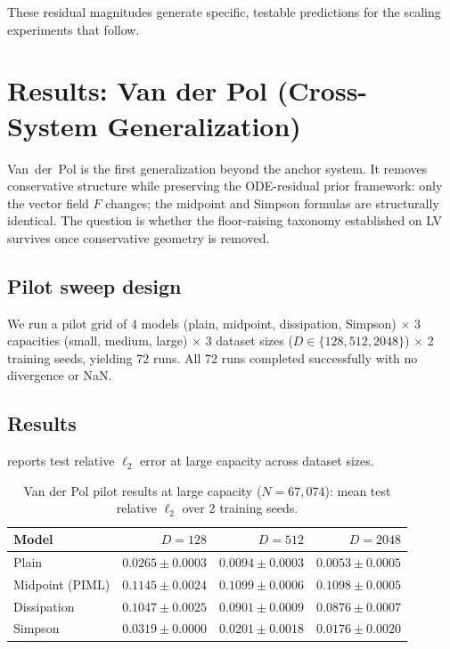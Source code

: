 \documentclass[11pt]{article}
\begin{document}
These residual magnitudes generate specific, testable predictions for the scaling experiments that follow.

\section{Results: Van der Pol (Cross-System Generalization)}
\label{sec:results-vdp}

Van~der~Pol is the first generalization beyond the anchor system.
It removes conservative structure while preserving the ODE-residual prior framework: only the vector field $F$ changes; the midpoint and Simpson formulas are structurally identical.
The question is whether the floor-raising taxonomy established on LV survives once conservative geometry is removed.

\subsection{Pilot sweep design}

We run a pilot grid of 4 models (plain, midpoint, dissipation, Simpson) $\times$ 3 capacities (small, medium, large) $\times$ 3 dataset sizes ($D \in \{128, 512, 2048\}$) $\times$ 2 training seeds, yielding 72 runs.
All 72 runs completed successfully with no divergence or NaN.

\subsection{Results}

 reports test relative $\ell_2$ error at large capacity across dataset sizes.

\begin{table}[H]
    \centering
    \caption{Van der Pol pilot results at large capacity ($N = 67{,}074$): mean test relative $\ell_2$ over 2 training seeds.}
    \label{tab:vdp-results}
    \small
    \begin{tabular}{lrrr}
        \toprule
        Model & $D = 128$ & $D = 512$ & $D = 2048$ \\
        \midrule
        Plain            & $0.0265 \pm 0.0003$ & $0.0094 \pm 0.0003$ & $0.0053 \pm 0.0005$ \\
        Midpoint (PIML)  & $0.1145 \pm 0.0024$ & $0.1099 \pm 0.0006$ & $0.1098 \pm 0.0005$ \\
        Dissipation      & $0.1047 \pm 0.0025$ & $0.0901 \pm 0.0009$ & $0.0876 \pm 0.0007$ \\
        Simpson          & $0.0319 \pm 0.0000$ & $0.0201 \pm 0.0018$ & $0.0176 \pm 0.0020$ \\
        \bottomrule
    \end{tabular}
\end{table}
\end{document}
